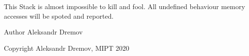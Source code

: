 This Stack is almost impossible to kill and fool. All undefined behaviour memory accesses will be spoted and reported. \begin{DoxyAuthor}{Author}
Aleksandr Dremov 
\end{DoxyAuthor}
\begin{DoxyCopyright}{Copyright}
Aleksandr Dremov, M\+I\+PT 2020 
\end{DoxyCopyright}
